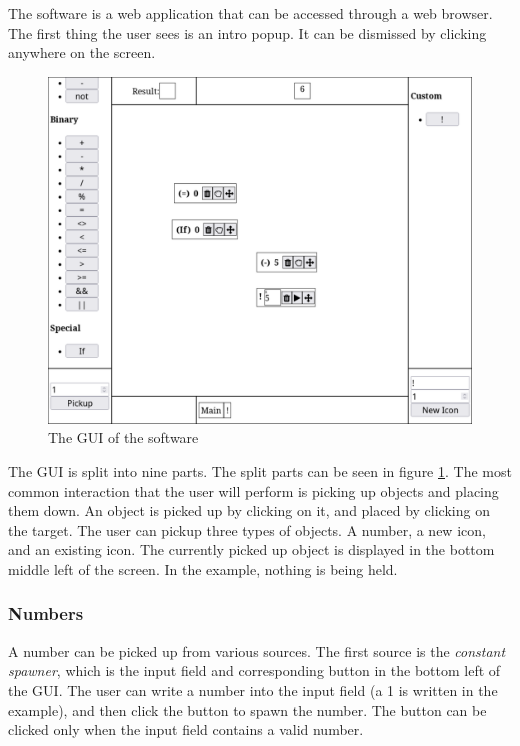 \documentclass{report}
\begin{document}
The software is a web application that can be accessed through a web browser. The first thing the user sees is an intro popup. It can be dismissed by clicking anywhere on the screen.

\begin{figure}[H]
    \centering
    \includegraphics[width=1\textwidth]{img/app.pdf}
    \caption{The GUI of the software}
    \label{fig:gui}
\end{figure}

\noindent
The GUI is split into nine parts. The split parts can be seen in figure \ref{fig:gui}.
The most common interaction that the user will perform is picking up objects and placing them down.
An object is picked up by clicking on it, and placed by clicking on the target.
The user can pickup three types of objects. A number, a new icon, and an existing icon.
The currently picked up object is displayed in the bottom middle left of the screen.
In the example, nothing is being held.

\subsubsection{Numbers}
A number can be picked up from various sources.
The first source is the \emph{constant spawner}, which is the input field and corresponding button in the bottom left of the GUI.
The user can write a number into the input field (a 1 is written in the example), and then click the button to spawn the number.
The button can be clicked only when the input field contains a valid number.
\end{document}
